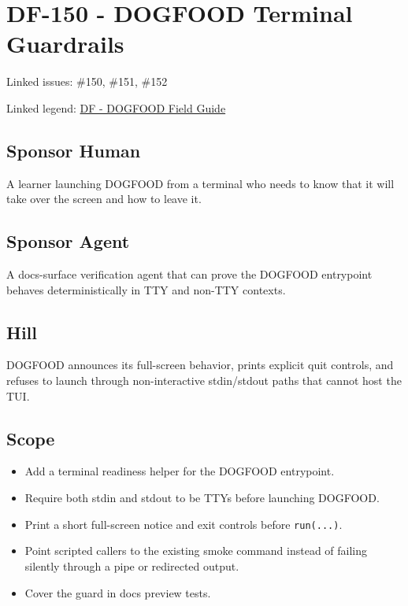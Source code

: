 \chapter{DF-150 - DOGFOOD Terminal Guardrails}\label{record-119}

\smallskip

Linked issues: \#150, \#151, \#152

Linked legend: \href{https://github.com/flyingrobots/bijou/blob/1853ad902f6bf219326409e7f743a5a1d6517dbc/docs/legends/DF-dogfood-field-guide.md}{DF - DOGFOOD Field Guide}

\section{Sponsor Human}\label{record-119-sponsor-human}

A learner launching DOGFOOD from a terminal who needs to know that it will take over the screen and how to leave it.

\section{Sponsor Agent}\label{record-119-sponsor-agent}

A docs-surface verification agent that can prove the DOGFOOD entrypoint behaves deterministically in TTY and non-TTY contexts.

\section{Hill}\label{record-119-hill}

DOGFOOD announces its full-screen behavior, prints explicit quit controls, and refuses to launch through non-interactive stdin/stdout paths that cannot host the TUI.

\section{Scope}\label{record-119-scope}

\begin{itemize}
\tightlist
\item
  Add a terminal readiness helper for the DOGFOOD entrypoint.
\item
  Require both stdin and stdout to be TTYs before launching DOGFOOD.
\item
  Print a short full-screen notice and exit controls before \texttt{r\allowbreak{}u\allowbreak{}n\allowbreak{}(\allowbreak{}.\allowbreak{}.\allowbreak{}.\allowbreak{})}.
\item
  Point scripted callers to the existing smoke command instead of failing silently through a pipe or redirected output.
\item
  Cover the guard in docs preview tests.
\end{itemize}


